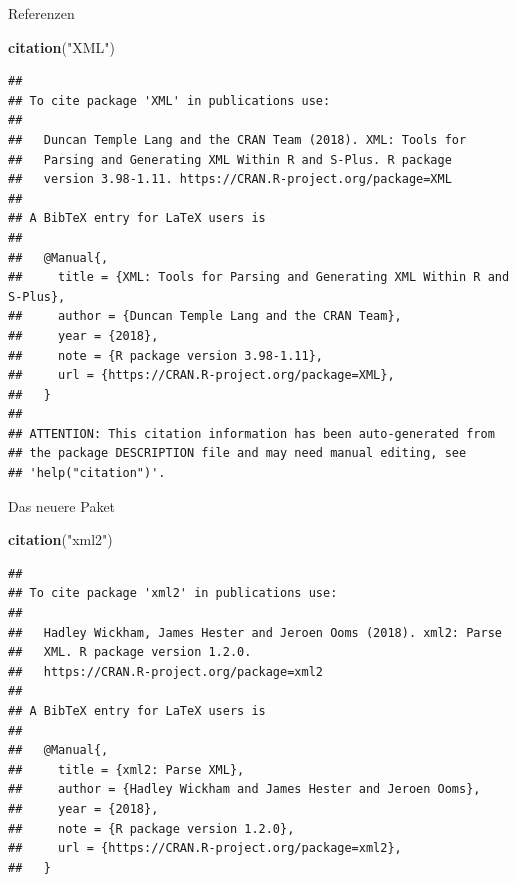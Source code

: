 \documentclass[ignorenonframetext,]{beamer}
\newenvironment{Shaded}{\begin{snugshade}}{\end{snugshade}}
\newcommand{\KeywordTok}[1]{\textcolor[rgb]{0.13,0.29,0.53}{\textbf{#1}}}
\newcommand{\NormalTok}[1]{#1}
\newcommand{\StringTok}[1]{\textcolor[rgb]{0.31,0.60,0.02}{#1}}
\begin{document}
\begin{frame}[fragile]{Referenzen}
\protect\hypertarget{referenzen}{}

\begin{Shaded}
\begin{Highlighting}[]
\KeywordTok{citation}\NormalTok{(}\StringTok{"XML"}\NormalTok{)}
\end{Highlighting}
\end{Shaded}

\begin{verbatim}
## 
## To cite package 'XML' in publications use:
## 
##   Duncan Temple Lang and the CRAN Team (2018). XML: Tools for
##   Parsing and Generating XML Within R and S-Plus. R package
##   version 3.98-1.11. https://CRAN.R-project.org/package=XML
## 
## A BibTeX entry for LaTeX users is
## 
##   @Manual{,
##     title = {XML: Tools for Parsing and Generating XML Within R and S-Plus},
##     author = {Duncan Temple Lang and the CRAN Team},
##     year = {2018},
##     note = {R package version 3.98-1.11},
##     url = {https://CRAN.R-project.org/package=XML},
##   }
## 
## ATTENTION: This citation information has been auto-generated from
## the package DESCRIPTION file and may need manual editing, see
## 'help("citation")'.
\end{verbatim}

\end{frame}

\begin{frame}[fragile]{Das neuere Paket}
\protect\hypertarget{das-neuere-paket}{}

\begin{Shaded}
\begin{Highlighting}[]
\KeywordTok{citation}\NormalTok{(}\StringTok{"xml2"}\NormalTok{)}
\end{Highlighting}
\end{Shaded}

\begin{verbatim}
## 
## To cite package 'xml2' in publications use:
## 
##   Hadley Wickham, James Hester and Jeroen Ooms (2018). xml2: Parse
##   XML. R package version 1.2.0.
##   https://CRAN.R-project.org/package=xml2
## 
## A BibTeX entry for LaTeX users is
## 
##   @Manual{,
##     title = {xml2: Parse XML},
##     author = {Hadley Wickham and James Hester and Jeroen Ooms},
##     year = {2018},
##     note = {R package version 1.2.0},
##     url = {https://CRAN.R-project.org/package=xml2},
##   }
\end{verbatim}

\end{frame}
\end{document}
